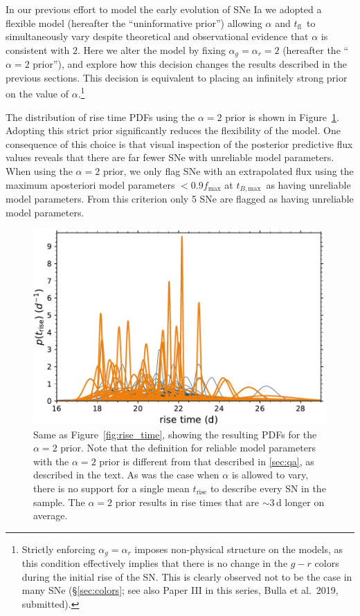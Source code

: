 \documentclass[twocolumn]{./aastex63}
\newcommand{\tfl}{$t_\mathrm{fl}$}
\newcommand{\tbmax}{$t_{B,\mathrm{max}}$}
\begin{document}
In our previous effort to model the early evolution of SNe Ia we adopted a
flexible model (hereafter the ``uninformative prior'') allowing $\alpha$ and
\tfl\ to simultaneously vary despite theoretical \citep{Arnett82,Riess99a} and
observational \citep{Conley06,Hayden10,Ganeshalingam11} evidence that $\alpha$
is consistent with $2$. Here we alter the model by fixing $\alpha_g = \alpha_r
= 2$ (hereafter the ``$\alpha = 2$ prior''), and explore how this decision
changes the results described in the previous sections. This decision is
equivalent to placing an infinitely strong prior on the value of
$\alpha$.\footnote{Strictly enforcing $\alpha_g = \alpha_r$ imposes
non-physical structure on the models, as this condition effectively implies
that there is no change in the $g - r$ colors during the initial rise of the
SN. This is clearly observed not to be the case in many SNe
(\S\ref{sec:colors}; see also Paper III in this series, Bulla et al.\ 2019,
submitted).}

The distribution of rise time PDFs using the $\alpha = 2$ prior is shown in
Figure~\ref{fig:tsquared_rise}. Adopting this strict prior significantly
reduces the flexibility of the model. One consequence of this choice is that
visual inspection of the posterior predictive flux values reveals that there
are far fewer SNe with unreliable model parameters. When using the $\alpha =
2$ prior, we only flag SNe with an extrapolated flux using the maximum
aposteriori model parameters $< 0.9 f_\mathrm{max}$ at \tbmax\ as having
unreliable model parameters. From this criterion only 5 SNe are flagged as
having unreliable model parameters.

\begin{figure}
    \centering
    \includegraphics[width=1\linewidth]{./figures/tsquared_rise_time.pdf}
    \caption{Same as Figure~\ref{fig:rise_time}, showing the resulting PDFs for
    the $\alpha = 2$ prior. Note that the definition for reliable model
    parameters with the $\alpha = 2$ prior is different from that described in
    \ref{sec:qa}, as described in the text. As was the case when $\alpha$ is
    allowed to vary, there is no support for a single mean $t_\mathrm{rise}$ to
    describe every SN in the sample. The $\alpha = 2$ prior results in rise
    times that are $\sim$3\,d longer on average.}
    \label{fig:tsquared_rise}
\end{figure}
\end{document}
